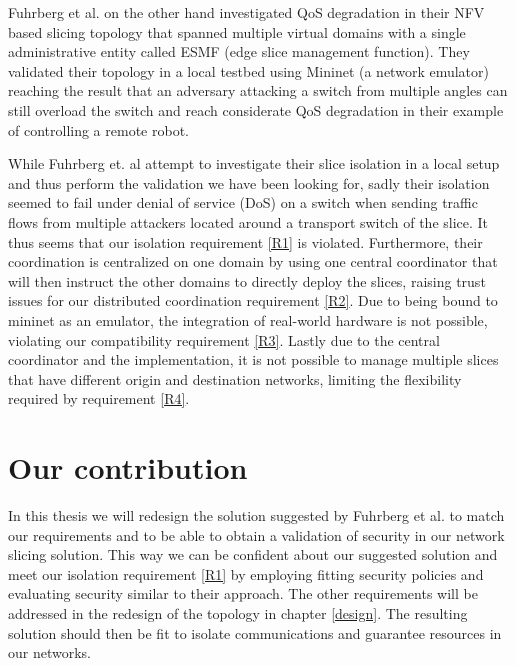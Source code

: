 Fuhrberg et al. \cite{SE4} on the other hand investigated QoS degradation in their NFV based slicing topology that spanned multiple virtual domains with a single administrative entity called ESMF (edge slice management function). They validated their topology in a local testbed using Mininet \cite{mininet} (a network emulator) reaching the result that an adversary attacking a switch from multiple angles can still overload the switch and reach considerate QoS degradation in their example of controlling a remote robot.

While Fuhrberg et. al \cite{SE4} attempt to investigate their slice isolation in a local setup and thus perform the validation we have been looking for, sadly their isolation seemed to fail under denial of service (DoS) on a switch when sending traffic flows from multiple attackers located around a transport switch of the slice. It thus seems that our isolation requirement \ref{R1} is violated. Furthermore, their coordination is centralized on one domain by using one central coordinator that will then instruct the other domains to directly deploy the slices, raising trust issues for our distributed coordination requirement \ref{R2}. Due to being bound to mininet \cite{mininet} as an emulator, the integration of real-world hardware is not possible, violating our compatibility requirement \ref{R3}. Lastly due to the central coordinator and the implementation, it is not possible to manage multiple slices that have different origin and destination networks, limiting the flexibility required by requirement \ref{R4}.

\section{Our contribution}
In this thesis we will redesign the solution suggested by Fuhrberg et al. \cite{SE4} to match our requirements and to be able to obtain a validation of security in our network slicing solution. This way we can be confident about our suggested solution and meet our isolation requirement \ref{R1} by employing fitting security policies and evaluating security similar to their approach. The other requirements will be addressed in the redesign of the topology in chapter \ref{design}. The resulting solution should then be fit to isolate communications and guarantee resources in our networks.


